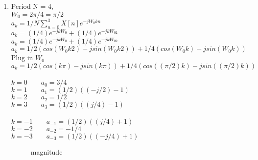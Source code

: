 \documentclass[10pt,a4paper, margin=1in]{article}
\begin{document}
\begin{enumerate}
\begin{enumerate}
    
    
    
    
    
    
    
    \item %
	Period N = 4,\\ $W_0 = 2\pi/4 = \pi / 2$ \\
    $ a_k = 1/N \sum_{n=0}^{3} X[n]e^{-jW_0kn}$ \\
    $ a_k = (1/4)e^{-jkW_0} + (1/4)e^{-jkW_02}$ \\
    $ a_k = (1/4)e^{-jkW_0} + (1/4)e^{-jkW_02}$ \\
    $ a_k=1/2(cos(W_0k2)-jsin(W_0k2) ) + 1/4(cos(W_0k)-jsin(W_0k)) $ \\
    Plug in $W_0$ \\
	$ a_k=1/2(cos(k \pi)-jsin(k \pi) ) + 1/4(cos((\pi /2)k)-jsin((\pi /2)k)) $ \\ \\
	
	$k=0   \qquad  a_0 = 3/4$ \\
    $k = 1 \qquad  a_1= (1/2)((-j/2)-1)$ \\
    $k = 2 \qquad  a_2= 1/2$ \\
    $k = 3 \qquad  a_3= (1/2)((j/4)-1)$ \\ \\

    $k = -1 \qquad  a_{-1}= (1/2)((j/4)+1)$ \\
    $k = -2 \qquad  a_{-2}= -1/4$ \\
    $k = -3 \qquad  a_{-3}= (1/2)((-j/4)+1)$ \\

    

	
\begin{figure} [h!]
    \centering
    \caption{ magnitude}
    \label{fig:q3}
\end{figure}
    

\end{enumerate}
\end{enumerate}
\end{document}
